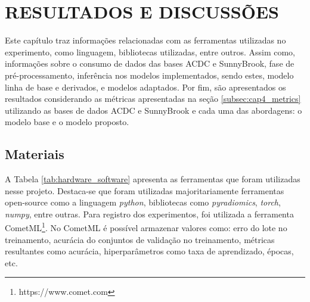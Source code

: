 \chapter{RESULTADOS E DISCUSSÕES}
\label{chap:proposta_experimental}

Este capítulo traz informações relacionadas com as ferramentas utilizadas no experimento, como linguagem, bibliotecas utilizadas, entre outros. Assim como, informações sobre o consumo de dados das bases \gls{ACDC} e SunnyBrook, fase de pré-processamento, inferência nos modelos implementados, sendo estes, modelo linha de base e derivados, e modelos adaptados. Por fim, são apresentados os resultados considerando as métricas apresentadas na seção \ref{subsec:cap4_metrics} utilizando as bases de dados ACDC e SunnyBrook e cada uma das abordagens: o modelo base e o modelo proposto.


\section{Materiais} 
\label{sec:cap5_materiais}

A Tabela \ref{tab:hardware_software} apresenta as ferramentas que foram utilizadas nesse projeto. Destaca-se que foram utilizadas majoritariamente ferramentas open-source como a linguagem \textit{python}, bibliotecas como \textit{pyradiomics}, \textit{torch}, \textit{numpy}, entre outras. Para registro dos experimentos, foi utilizada a ferramenta CometML\footnote{https://www.comet.com}. No CometML é possível armazenar valores como: erro do lote no treinamento, acurácia do conjuntos de validação no treinamento, métricas resultantes como acurácia, hiperparâmetros como taxa de aprendizado, épocas, etc.
\newline

